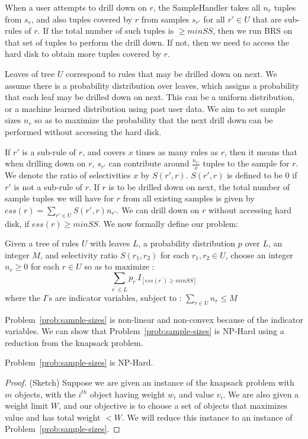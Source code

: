{When a user attempts to drill down on $r$, the SampleHandler takes all $n_r$ tuples from $s_r$, and also tuples covered by $r$ from samples $s_{r'}$ for all $r' \in U$ that are sub-rules of $r$. If the total number of such tuples is $\geq minSS$, then we run BRS on that set of tuples to perform the drill down. If not, then we need to access the hard disk to obtain more tuples covered by $r$.

Leaves of tree $U$ correspond to rules that may be drilled down on next. We assume there is a probability distribution over leaves, which assigns a probability that each leaf may be drilled down on next. This can be a uniform distribution, or a machine learned distribution using past user data. We aim to set sample sizes $n_r$ so as to maximize the probability that the next drill down can be performed without accessing the hard disk. 

If $r'$ is a sub-rule of $r$, and covers $x$ times as many rules as $r$, then it means that when drilling down on $r$, $s_{r'}$ can contribute around $\frac{n_{r'}}{x}$ tuples to the sample for $r$. We denote the ratio of selectivities $x$ by $S(r',r)$. $S(r',r)$ is defined to be $0$ if $r'$ is not a sub-rule of $r$. If $r$ is to be drilled down on next, the total number of sample tuples we will have for $r$ from all existing samples is given by $ess(r) = \sum_{r'\in U} S(r', r)n_{r'}$. We can drill down on $r$ without accessing hard disk, if $ess(r) \geq minSS$. We now formally define our problem: 
\begin{problem}\label{prob:sample-sizes}
Given a tree of rules $U$ with leaves $L$, a probability distribution $p$ over $L$, an integer $M$, and selectivity ratio $S(r_1, r_2)$ for each $r_1, r_2 \in U$, 
choose an integer $n_r \geq 0$ for each $r \in U$ so as to $\textrm{maximize}$ :
$$\sum_{r^{\prime} \in L} p_{r^{\prime}}I_{[ess(r^{\prime}) \geq minSS]}$$
where the $I$'s are indicator variables, subject to :
$\sum_{r \in U} n_r \leq M$
\end{problem}
Problem~\ref{prob:sample-sizes} is non-linear and non-convex because of the indicator variables. 
We can show that Problem~\ref{prob:sample-sizes} is {\sc NP-Hard} using a reduction from the knapsack problem. 
\begin{lemma}\label{lemma:sampling-hardness}
Problem~\ref{prob:sample-sizes} is {\sc NP-Hard}.
\end{lemma}
\begin{proof}(Sketch)
Suppose we are given an instance of the knapsack problem with $m$ objects, with the $i^{th}$ object having weight $w_i$ and value $v_i$. We are also given a weight limit $W$, and our objective is to choose a set of objects that maximizes value and has total weight $< W$. We will reduce this instance to an instance of Problem~\ref{prob:sample-sizes}.


\end{proof}}
